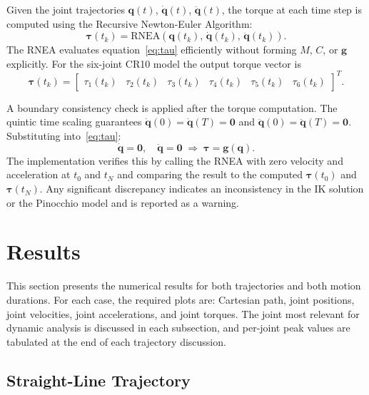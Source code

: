 \documentclass[12pt,a4paper]{article}
\begin{document}
Given the joint trajectories $\bm{q}(t)$, $\dot{\bm{q}}(t)$, $\ddot{\bm{q}}(t)$, the
torque at each time step is computed using the Recursive Newton-Euler Algorithm:
\begin{equation}
    \bm{\tau}(t_k)
    = \mathrm{RNEA}\!\left(\bm{q}(t_k),\,\dot{\bm{q}}(t_k),\,\ddot{\bm{q}}(t_k)\right).
    \label{eq:rnea}
\end{equation}
The RNEA evaluates equation~\eqref{eq:tau} efficiently without forming $M$, $C$, or
$\bm{g}$ explicitly. For the six-joint CR10 model the output torque vector is
\begin{equation}
    \bm{\tau}(t_k) =
    \begin{bmatrix}
        \tau_1(t_k) & \tau_2(t_k) & \tau_3(t_k) &
        \tau_4(t_k) & \tau_5(t_k) & \tau_6(t_k)
    \end{bmatrix}^{\!T}.
\end{equation}

A boundary consistency check is applied after the torque computation. The quintic time scaling
guarantees $\dot{\bm{q}}(0) = \dot{\bm{q}}(T) = \bm{0}$ and
$\ddot{\bm{q}}(0) = \ddot{\bm{q}}(T) = \bm{0}$. Substituting into~\eqref{eq:tau}:
\begin{equation}
    \dot{\bm{q}} = \bm{0},\quad \ddot{\bm{q}} = \bm{0}
    \;\Rightarrow\;
    \bm{\tau} = \bm{g}(\bm{q}).
    \label{eq:gravity_check}
\end{equation}
The implementation verifies this by calling the RNEA with zero velocity and acceleration at
$t_0$ and $t_N$ and comparing the result to the computed $\bm{\tau}(t_0)$ and $\bm{\tau}(t_N)$.
Any significant discrepancy indicates an inconsistency in the IK solution or the Pinocchio
model and is reported as a warning.

\section{Results}

This section presents the numerical results for both trajectories and both motion durations.
For each case, the required plots are: Cartesian path, joint positions, joint velocities,
joint accelerations, and joint torques. The joint most relevant for dynamic analysis is
discussed in each subsection, and per-joint peak values are tabulated at the end of each
trajectory discussion.

\subsection{Straight-Line Trajectory}
\end{document}
